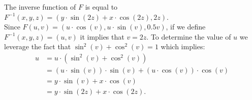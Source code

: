 \begin{solution}
The inverse function of $F$ is equal to $F^{-1}(x,y,z) = (y \cdot \sin(2z) + x \cdot \cos(2z), 2z)$.\\[0.2cm]
Since $F(u,v) = (u \cdot \cos(v), u \cdot \sin(v), 0.5 v)$, if we define $F^{-1}(x,y,z) = (u,v)$ it implies that $v=2z$. To determine the value of $u$ we leverage the fact that $\sin^2(v) + \cos^2(v) = 1$ which implies:
$$\begin{aligned}
	u &= u \cdot (\sin^2(v) + \cos^2(v))\\
	&= (u \cdot \sin(v)) \cdot \sin(v) + (u \cdot \cos(v)) \cdot \cos(v) \\
	&= y \cdot \sin(v) + x \cdot \cos(v) \\
	&= y \cdot \sin(2z) + x \cdot \cos(2z).
\end{aligned} $$
\end{solution}

